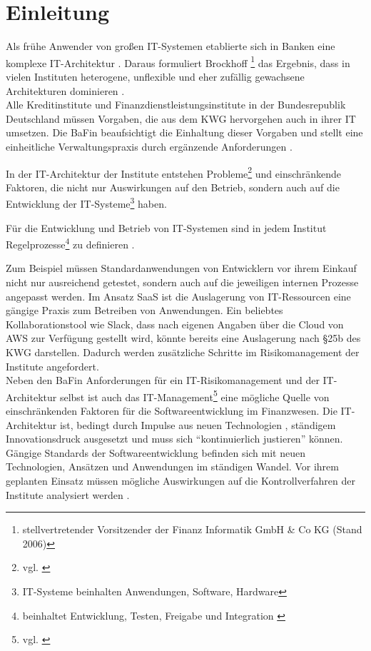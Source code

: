 \chapter{Einleitung}
\label{ch:intro}

Als frühe Anwender von großen IT-Systemen etablierte sich in Banken eine komplexe IT-Architektur \cite{Brockhoff2006}. Daraus formuliert Brockhoff \footnote{stellvertretender Vorsitzender der Finanz Informatik GmbH \& Co KG (Stand 2006)} das Ergebnis, dass in vielen Instituten heterogene, unflexible und eher zufällig gewachsene Architekturen dominieren \cite{Brockhoff2006}.
\medskip
\\
Alle Kreditinstitute und Finanzdienstleistungsinstitute in der Bundesrepublik Deutschland müssen Vorgaben, die aus dem \ac{KWG} hervorgehen auch in ihrer IT umsetzen. Die \ac{BaFin} beaufsichtigt die Einhaltung dieser Vorgaben und stellt eine einheitliche Verwaltungspraxis \cite{BaFin:Verwaltungspraxis} durch ergänzende Anforderungen \cite{MaRisk:2017, BAIT:2018}. 

In der IT-Architektur der Institute entstehen Probleme\footnote{vgl. \cite{mci/Disterer2011}} und einschränkende Faktoren, die nicht nur Auswirkungen auf den Betrieb, sondern auch auf die Entwicklung der IT-Systeme\footnote{IT-Systeme beinhalten Anwendungen, Software, Hardware} haben. 

Für die Entwicklung und Betrieb von IT-Systemen sind in jedem Institut Regelprozesse\footnote{beinhaltet Entwicklung, Testen, Freigabe und Integration \cite{MaRisk:2017}} zu definieren \cite{MaRisk:2017}. 

Zum Beispiel müssen Standardanwendungen von Entwicklern vor ihrem Einkauf nicht nur ausreichend getestet, sondern auch auf die jeweiligen internen Prozesse angepasst werden. Im Ansatz \ac{SaaS} ist die Auslagerung von IT-Ressourcen eine gängige Praxis zum Betreiben von Anwendungen. Ein beliebtes Kollaborationstool wie Slack, dass nach eigenen Angaben über die Cloud von \ac{AWS} zur Verfügung gestellt wird, könnte bereits eine Auslagerung nach §25b des \ac{KWG} darstellen. Dadurch werden zusätzliche Schritte im Risikomanagement der Institute angefordert.
\medskip
\\
Neben den BaFin Anforderungen für ein IT-Risikomanagement und der IT-Architektur selbst ist auch das IT-Management\footnote{vgl. \cite{Alt2017}} eine mögliche Quelle von einschränkenden Faktoren für die Softwareentwicklung im Finanzwesen. Die IT-Architektur ist, bedingt durch Impulse aus neuen Technologien \cite{Bussmann2006}, ständigem Innovationsdruck ausgesetzt und muss sich \enquote{kontinuierlich justieren} \cite{Bussmann2006} können. 
\medskip
\\
Gängige Standards der Softwareentwicklung befinden sich mit neuen Technologien, Ansätzen und Anwendungen im ständigen Wandel. Vor ihrem geplanten Einsatz müssen mögliche Auswirkungen auf die Kontrollverfahren der Institute analysiert werden \cite{MaRisk:2017}.

